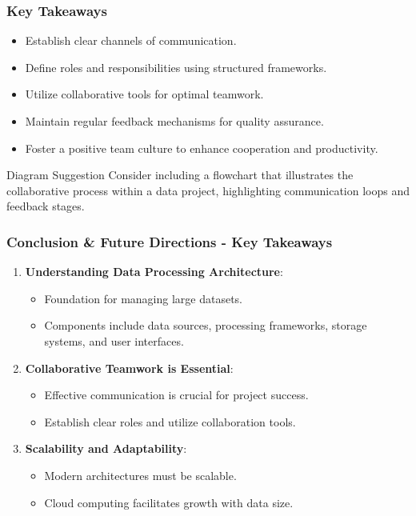 \documentclass[aspectratio=169]{beamer}
\begin{document}
\begin{frame}[fragile]
    \frametitle{Key Takeaways}
    \begin{itemize}
        \item Establish clear channels of communication.
        \item Define roles and responsibilities using structured frameworks.
        \item Utilize collaborative tools for optimal teamwork.
        \item Maintain regular feedback mechanisms for quality assurance.
        \item Foster a positive team culture to enhance cooperation and productivity.
    \end{itemize}

    \begin{block}{Diagram Suggestion}
        Consider including a flowchart that illustrates the collaborative process within a data project, highlighting communication loops and feedback stages.
    \end{block}
\end{frame}

\begin{frame}[fragile]
    \frametitle{Conclusion \& Future Directions - Key Takeaways}
    \begin{enumerate}
        \item \textbf{Understanding Data Processing Architecture}:
        \begin{itemize}
            \item Foundation for managing large datasets.
            \item Components include data sources, processing frameworks, storage systems, and user interfaces.
        \end{itemize}

        \item \textbf{Collaborative Teamwork is Essential}:
        \begin{itemize}
            \item Effective communication is crucial for project success.
            \item Establish clear roles and utilize collaboration tools.
        \end{itemize}

        \item \textbf{Scalability and Adaptability}:
        \begin{itemize}
            \item Modern architectures must be scalable.
            \item Cloud computing facilitates growth with data size.
        \end{itemize}
    \end{enumerate}
\end{frame}
\end{document}
